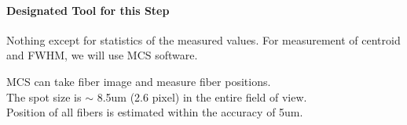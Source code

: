 \paragraph{Designated Tool for this Step}
Nothing except for statistics of the measured values.
For measurement of centroid and FWHM, we will use MCS software.


\begin{itembox}[l]{}
MCS can take fiber image and measure fiber positions. \\
The spot size is $\sim$ 8.5um (2.6 pixel) in the entire field of view. \\
Position of all fibers is estimated within the accuracy of 5um.

\end{itembox}